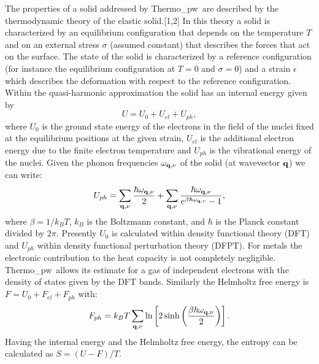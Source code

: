 \documentclass[12pt,a4paper,twoside]{report}
\def\tpw{{\sc Thermo\_pw}}
\begin{document}
The properties of a solid addressed by \tpw\ are described by the thermodynamic
theory of the elastic solid.[1,2] In this theory a solid is characterized by an
equilibrium configuration that depends on the temperature $T$ and on an
external stress $\sigma$ (assumed constant) that describes the forces 
that act on the surface. The state
of the solid is characterized by a reference configuration 
(for instance the equilibrium configuration at $T=0$ and $\sigma=0$) and 
a strain $\epsilon$ which describes the deformation with respect to the 
reference configuration. 
Within the quasi-harmonic approximation the solid has an internal
energy given by  
\begin{equation}
U=U_0 + U_{el} + U_{ph},
\end{equation}
where $U_0$ is the ground state energy of the electrons in the field 
of the nuclei fixed at the equilibrium positions at the given strain, 
$U_{el}$ is the additional electron energy due to the 
finite electron temperature and $U_{ph}$ is the vibrational energy of the nuclei. 
Given the phonon frequencies $\omega_{{\bf q},\nu}$ of the solid 
(at wavevector ${\bf q}$) we can write:
\begin{equation}
U_{ph} = \sum_{{\bf q},\nu} {\hbar \omega_{{\bf q},\nu} \over 2}
+ \sum_{{\bf q},\nu} {\hbar \omega_{{\bf q},\nu} \over 
e^{\beta \hbar \omega_{{\bf q},\nu}}-1},
\label{uvib}
\end{equation}
where $\beta=1/ k_B T$, $k_B$ is the Boltzmann constant, and $\hbar$ is the
Planck constant divided by $2\pi$.
Presently $U_0$ is calculated within density functional theory (DFT) and
$U_{ph}$ within density functional perturbation theory (DFPT). 
For metals the electronic contribution to the heat capacity is not 
completely negligible. \tpw\ allows its estimate for a gas of 
independent electrons with the density of states given by the DFT bands.
Similarly the Helmholtz free energy is $F=U_0+F_{el}+F_{ph}$ with:
\begin{equation}
F_{ph} = k_B T \sum_{{\bf q},\nu} \ln \left[ 2 \sinh \left({\beta \hbar 
\omega_{{\bf q},\nu} \over 2}\right) \right].
\nonumber
\end{equation}
Having the internal energy and the Helmholtz free energy, the entropy can 
be calculated as $S=(U-F)/T$.
\end{document}
